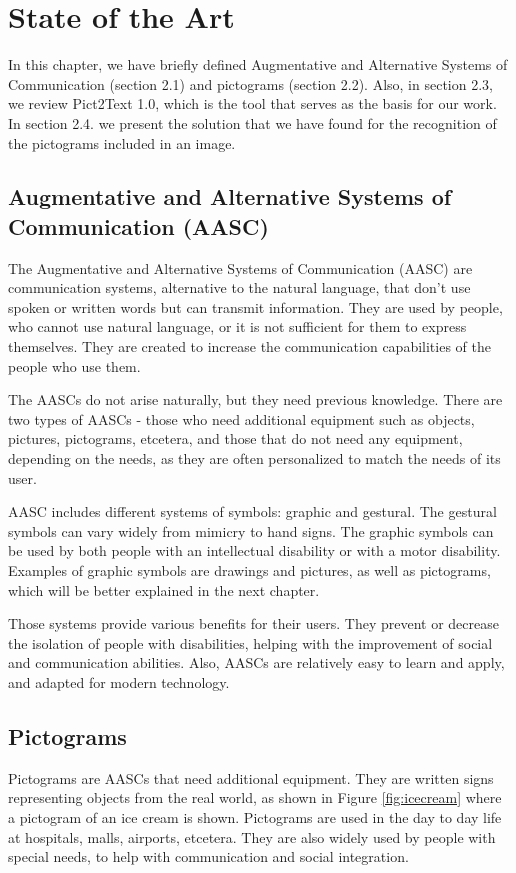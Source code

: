 
\chapter{State of the Art}
\label{State of the Art}

In this chapter, we have briefly defined Augmentative and Alternative Systems of Communication (section 2.1) and pictograms (section 2.2). Also, in section 2.3, we review Pict2Text 1.0, which is the tool that serves as the basis for our work. In section 2.4. we present the solution that we have found for the recognition of the pictograms included in an image.


\section{Augmentative and Alternative Systems of Communication (AASC)}
The Augmentative and Alternative Systems of Communication (AASC)  are communication systems, alternative to the natural language, that don't use spoken or written words but can transmit information. They are used by people, who cannot use natural language, or it is not sufficient for them to express themselves. They are created to increase the communication capabilities of the people who use them.

The AASCs do not arise naturally, but they need previous knowledge. There are two types of AASCs - those who need additional equipment such as objects, pictures, pictograms, etcetera, and those that do not need any equipment, depending on the needs, as they are often personalized to match the needs of its user.

AASC includes different systems of symbols: graphic and gestural. The gestural symbols can vary widely from mimicry to hand signs. The graphic symbols can be used by both people with an intellectual disability or with a motor disability. Examples of graphic symbols are drawings and pictures, as well as pictograms, which will be better explained in the next chapter.

Those systems provide various benefits for their users. They prevent or decrease the isolation of people with disabilities, helping with the improvement of social and communication abilities. Also, AASCs are relatively easy to learn and apply, and adapted for modern technology. 


\section{Pictograms}
Pictograms are AASCs that need additional equipment. They are written signs representing objects from the real world, as shown in Figure \ref{fig:icecream} where a pictogram of an ice cream is shown. Pictograms are used in the day to day life at hospitals, malls, airports, etcetera. They are also widely used by people with special needs, to help with communication and social integration.

